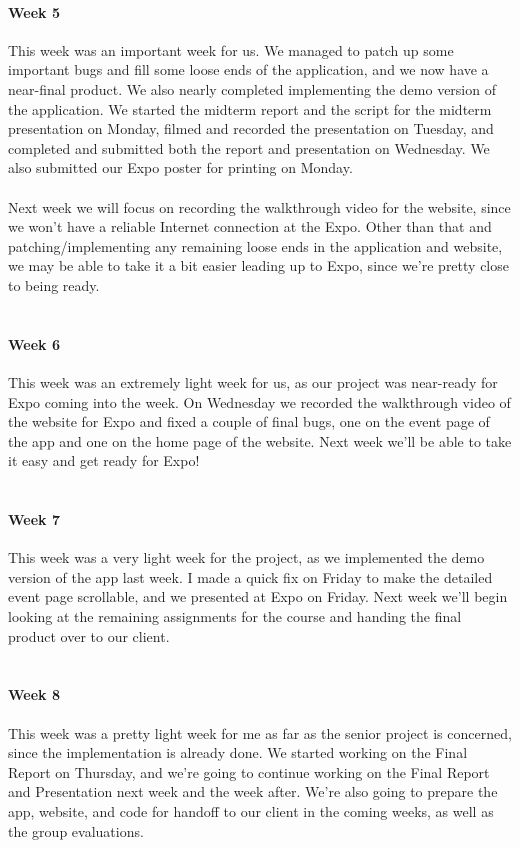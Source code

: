 \documentclass[onecolumn, draftclsnofoot,10pt, compsoc]{IEEEtran}
\begin{document}
      \paragraph{Week 5}
      This week was an important week for us. We managed to patch up some important bugs and fill some loose ends of the application, and we now have a near-final product. We also nearly completed implementing the demo version of the application. We started the midterm report and the script for the midterm presentation on Monday, filmed and recorded the presentation on Tuesday, and completed and submitted both the report and presentation on Wednesday. We also submitted our Expo poster for printing on Monday. \\ \\
      Next week we will focus on recording the walkthrough video for the website, since we won't have a reliable Internet connection at the Expo. Other than that and patching/implementing any remaining loose ends in the application and website, we may be able to take it a bit easier leading up to Expo, since we're pretty close to being ready. \\ \\

      \paragraph{Week 6}
      This week was an extremely light week for us, as our project was near-ready for Expo coming into the week. On Wednesday we recorded the walkthrough video of the website for Expo and fixed a couple of final bugs, one on the event page of the app and one on the home page of the website. Next week we'll be able to take it easy and get ready for Expo! \\ \\

      \paragraph{Week 7}
      This week was a very light week for the project, as we implemented the demo version of the app last week. I made a quick fix on Friday to make the detailed event page scrollable, and we presented at Expo on Friday. Next week we'll begin looking at the remaining assignments for the course and handing the final product over to our client. \\ \\

      \paragraph{Week 8}
      This week was a pretty light week for me as far as the senior project is concerned, since the implementation is already done. We started working on the Final Report on Thursday, and we're going to continue working on the Final Report and Presentation next week and the week after. We're also going to prepare the app, website, and code for handoff to our client in the coming weeks, as well as the group evaluations. \\ \\
\end{document}
